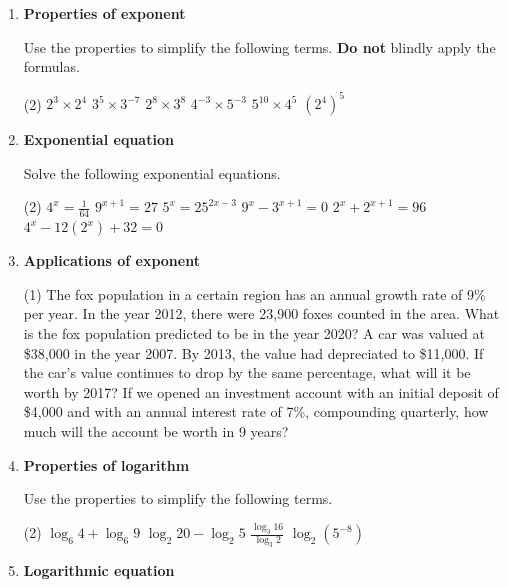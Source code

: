 \begin{enumerate}
\item \textbf{Properties of exponent} 

Use the properties to simplify the following terms. \textbf{Do not} blindly apply the formulas.
\begin{tasks}[after-item-skip = 30pt, after-skip = 30pt](2)
\task $2^3 \times 2^4$
\task $3^5 \times 3^{-7}$
\task $2^8 \times 3^8$
\task $4^{-3} \times 5^{-3}$
\task $5^{10} \times 4^{5}$
\task $(2^4)^5$
\end{tasks}

\item \textbf{Exponential equation} 

Solve the following exponential equations.
\begin{tasks}[after-item-skip = 30pt, after-skip = 30pt](2)
\task $4^x = \frac{1}{64}$
\task $9^{x+1} = 27$
\task $5^{x} = 25^{2x-3}$
\task $9^{x} - 3^{x+1} = 0$
\task $2^{x} + 2^{x+1} = 96$
\task $4^x - 12 (2^x) + 32 = 0$ 
\end{tasks}

\item \textbf{Applications of exponent} 
\begin{tasks}[after-item-skip = 90pt, after-skip = 90pt](1)
\task The fox population in a certain region has an annual growth rate of 9\% per year. In the year 2012, there were 23,900 foxes counted in the area. What is the fox population predicted to be in the year 2020?
\task A car was valued at \$38,000 in the year 2007. By 2013, the value had depreciated to \$11,000. If the car’s value continues to drop by the same percentage, what will it be worth by 2017?
\task If we opened an investment account with an initial deposit of \$4,000 and with an annual interest rate of 7\%, compounding quarterly, how much will the account be worth in 9 years? 
\end{tasks}

\newpage

\item \textbf{Properties of logarithm} 

Use the properties to simplify the following terms.
\begin{tasks}[after-item-skip = 40pt, after-skip = 40pt](2)
\task $\log_6 4 + \log_6 9$
\task $\log_2 20 - \log_2 5$
\task $\frac{\log_3 16}{\log_3 2}$
\task $\log_2 (5^{-8})$ 
\end{tasks}

\item \textbf{Logarithmic equation} 


\end{enumerate}
